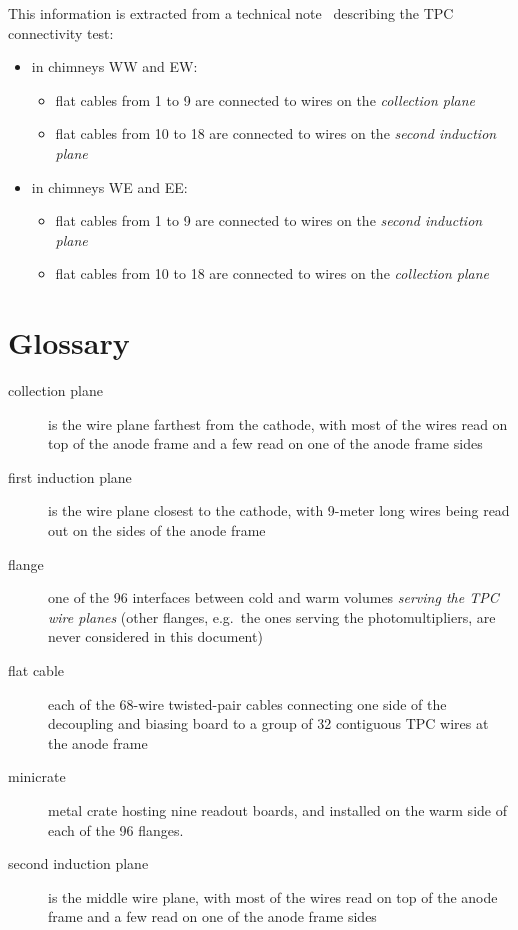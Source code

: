 \documentclass{article}
\newcommand{\eg}{e.g.\ }
\begin{document}
This information is extracted from a technical note~\cite{SBNDocDBxxxx:ConnTest} describing the TPC connectivity test:
\begin{itemize}
  \item in chimneys WW and EW:
    \begin{itemize}
      \item flat cables from 1 to 9 are connected to wires on the \emph{collection plane}
      \item flat cables from 10 to 18 are connected to wires on the \emph{second induction plane}
    \end{itemize}
  \item in chimneys WE and EE:
    \begin{itemize}
      \item flat cables from 1 to 9 are connected to wires on the \emph{second induction plane}
      \item flat cables from 10 to 18 are connected to wires on the \emph{collection plane}
    \end{itemize}
\end{itemize}



\section{Glossary}
\label{sec:glossary}

\begin{description}
  \item[collection plane] is the wire plane farthest from the cathode,
    with most of the wires read on top of the anode frame and a few read on one
    of the anode frame sides
  \item[first induction plane] is the wire plane closest to the cathode,
    with 9-meter long wires being read out on the sides of the anode frame
  \item[flange] one of the 96 interfaces between cold and warm volumes
    \emph{serving the TPC wire planes}
    (other flanges, \eg the ones serving the photomultipliers, are never
    considered in this document)
  \item[flat cable] each of the 68-wire twisted-pair cables connecting one side
    of the decoupling and biasing board to a group of 32 contiguous TPC wires
    at the anode frame
  \item[minicrate] metal crate hosting nine readout boards,
    and installed on the warm side of each of the 96 flanges.
  \item[second induction plane] is the middle wire plane,
    with most of the wires read on top of the anode frame and a few read on one
    of the anode frame sides
\end{description}
\end{document}
